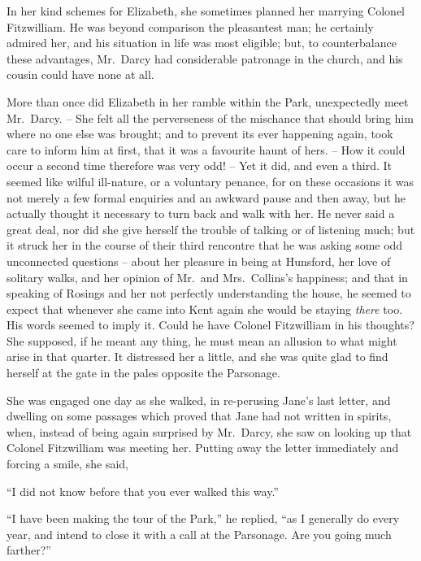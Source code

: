 In her kind schemes for Elizabeth, she sometimes
plann\-ed her marrying Colonel Fitzwilliam. He was beyond
comparison the pleasantest man; he certainly admired
her, and his situation in life was most eligible; but, to
counterbalance these advantages, Mr.\ Darcy had considerable
patronage in the church, and his cousin could
have none at all.


More than once did Elizabeth in her ramble within
the Park, unexpectedly meet Mr.\ Darcy. -- She felt all the
perverseness of the mischance that should bring him where
no one else was brought; and to prevent its ever happening
again, took care to inform him at first, that it was a
favourite haunt of hers. -- How it could occur a second
time therefore was very odd! -- Yet it did, and even a third.
It seemed like wilful ill-nature, or a voluntary penance,
for on these occasions it was not merely a few formal
enquiries and an awkward pause and then away, but he
actually thought it necessary to turn back and walk with
her. He never said a great deal, nor did she give herself
the trouble of talking or of listening much; but it struck
her in the course of their third rencontre that he was
asking some odd unconnected questions -- about her
pleasure in being at Hunsford, her love of solitary walks,
and her opinion of Mr.\ and Mrs.\ Collins’s happiness;
and that in speaking of Rosings and her not perfectly
understanding the house, he seemed to expect that whenever
she came into Kent again she would be staying \textit{there}
too. His words seemed to imply it. Could he have
Colonel Fitzwilliam in his thoughts? She supposed, if he
meant any thing, he must mean an allusion to what might
arise in that quarter. It distressed her a little, and she
was quite glad to find herself at the gate in the pales
opposite the Parsonage.

She was engaged one day as she walked, in re-perusing
Jane’s last letter, and dwelling on some passages which
proved that Jane had not written in spirits, when, instead
of being again surprised by Mr.\ Darcy, she saw on looking
up that Colonel Fitzwilliam was meeting her. Putting
away the letter immediately and forcing a smile, she said,

“I did not know before that you ever walked this way.”

“I have been making the tour of the Park,” he replied,
“as I generally do every year, and intend to close it with
a call at the Parsonage. Are you going much farther?”

